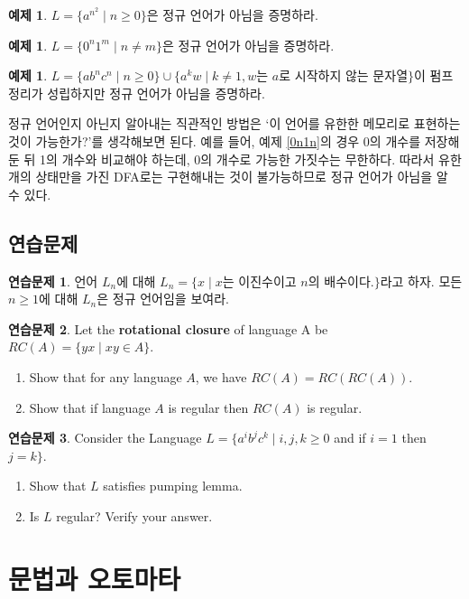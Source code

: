 \documentclass[b5paper, 11pt]{book}
\theoremstyle{definition}
\newtheorem{ex}[defn]{예제}
\newtheorem{ec}{연습문제}[chapter]
\begin{document}
\begin{ex}
    $L = \{a^{n^2} \;\vert\; n \ge 0\}$은 정규 언어가 아님을 증명하라.
\end{ex}
\begin{ex}
     $L = \{0^n 1^m \;\vert\; n \neq m\}$은 정규 언어가 아님을 증명하라.
\end{ex}
\begin{ex} 
    $L = \{ab^n c^n \;\vert\; n \ge 0\} \cup \{ a^k w \;\vert\; k \neq 1, w\text{는 } a\text{로 시작하지 않는 문자열} \}$이 펌프 정리가 성립하지만 정규 언어가 아님을 증명하라.
\end{ex}
정규 언어인지 아닌지 알아내는 직관적인 방법은 `이 언어를 유한한 메모리로 표현하는 것이 가능한가?'를 생각해보면 된다. 예를 들어, 예제 \ref{0n1n}의 경우 0의 개수를 저장해 둔 뒤 1의 개수와 비교해야 하는데, 0의 개수로 가능한 가짓수는 무한하다. 따라서 유한 개의 상태만을 가진 DFA로는 구현해내는 것이 불가능하므로 정규 언어가 아님을 알 수 있다. 
\section{연습문제}
\begin{ec}
    언어 $L_n$에 대해 
    $L_n = \{x \;\vert\; x$는 이진수이고 $n$의 배수이다.$\}$라고 하자. 
    모든 $n\ge 1$에 대해 $L_n$은 정규 언어임을 보여라. 
\end{ec}
\begin{ec}
    Let the \textbf{rotational closure} of language A be $RC(A) = \{yx\;\vert\; xy \in A\}$.
    \begin{enumerate}
        \item Show that for any language $A$, we have $RC(A) = RC(RC(A))$.
        \item Show that if language $A$ is regular then $RC(A)$ is regular.
    \end{enumerate}
\end{ec}
\begin{ec}
    Consider the Language $L= \{a^i b^j c^k \;\vert\; i, j, k \ge 0$ 
    and if $i = 1$ then $j=k\}$.
    \begin{enumerate}
        \item Show that $L$ satisfies pumping lemma.
        \item Is $L$ regular? Verify your answer.
    \end{enumerate}
\end{ec}
\chapter{문법과 오토마타} 
\end{document}
